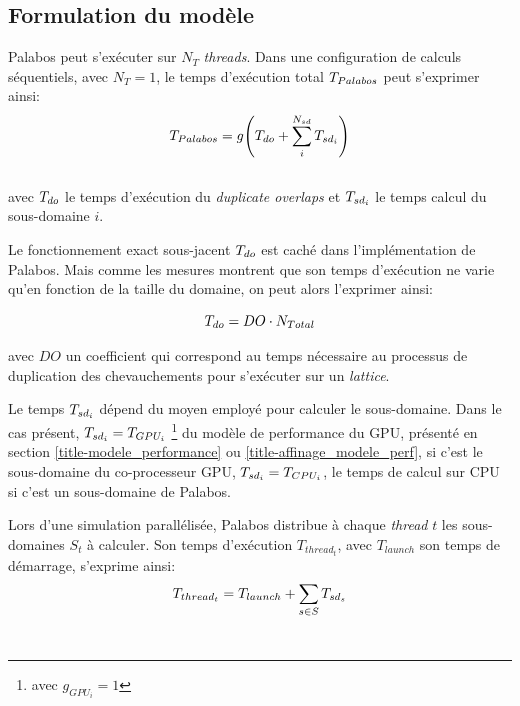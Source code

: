 \subsection{Formulation du modèle}

Palabos peut s'exécuter sur $N_T$ \textit{threads}. Dans une configuration de calculs séquentiels, avec $N_T=1$, le temps d'exécution total $T_{Palabos} $ peut s'exprimer ainsi:
\begin{equation}
T_{Palabos} = g \Bigg(T_{do} + \sum_{i}^{N_{sd}} T_{sd_i} \Bigg) 
\end{equation}\\[-\baselineskip]

avec $T_{do}$ le temps d'exécution du \textit{duplicate overlaps} et $T_{sd_i}$ le temps calcul du sous-domaine $i$.

Le fonctionnement exact sous-jacent $T_{do}$ est caché dans l'implémentation de Palabos. Mais comme les mesures montrent que son temps d'exécution ne varie qu'en fonction de la taille du domaine, on peut alors l'exprimer ainsi:\\

\newcommand{\docoef}[0]{DO}

\begin{equation}
\Time_{do}  = \docoef \cdot N_{Total}
\end{equation}

\noindent avec $\docoef$ un coefficient qui correspond au temps nécessaire au processus de duplication des chevauchements pour s'exécuter sur un \textit{lattice}.

Le temps $T_{sd_i}$ dépend du moyen employé pour calculer le sous-domaine. Dans le cas présent, $T_{sd_i} = T_{GPU_i}$ \footnote{avec $g_{GPU_i}=1$} du modèle de performance du \acs{GPU}, présenté en section \ref{title-modele_performance} ou \ref{title-affinage_modele_perf}, si c'est le sous-domaine du co-processeur \acs{GPU},  $T_{sd_i} = T_{CPU_i}$, le temps de calcul sur \acs{CPU} si c'est un sous-domaine de Palabos.

Lors d'une simulation parallélisée, Palabos distribue à chaque \textit{thread} $t$ les sous-domaines $S_t$ à calculer. Son temps d'exécution $T_{thread_t}$, avec $T_{launch}$ son temps de démarrage, s'exprime ainsi:
\begin{equation}
T_{thread_t} =  T_{launch} + \sum_{s\in S} T_{sd_s} 
\end{equation}\\[-\baselineskip]

